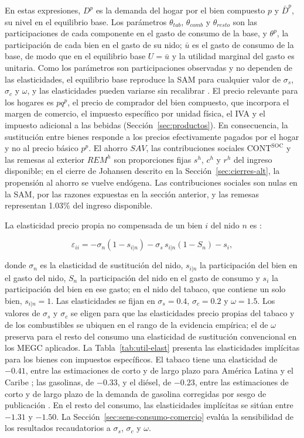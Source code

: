 \documentclass[11pt]{article}
\begin{document}
En estas expresiones, $D^{p}$ es la demanda del hogar por el bien compuesto $p$ y $\bar{D}^{p}$, su nivel en el equilibrio base. Los parámetros $\theta_{tab}$, $\theta_{comb}$ y $\theta_{resto}$ son las participaciones de cada componente en el gasto de consumo de la base, y $\theta^{p}$, la participación de cada bien en el gasto de su nido; $\bar{u}$ es el gasto de consumo de la base, de modo que en el equilibrio base $U=\bar{u}$ y la utilidad marginal del gasto es unitaria. Como los parámetros son participaciones observadas y no dependen de las elasticidades, el equilibrio base reproduce la SAM para cualquier valor de $\sigma_{s}$, $\sigma_{c}$ y $\omega$, y las elasticidades pueden variarse sin recalibrar \cite{rutherford_1995}. El precio relevante para los hogares es $pq^{p}$, el precio de comprador del bien compuesto, que incorpora el margen de comercio, el impuesto específico por unidad física, el IVA y el impuesto adicional a las bebidas (Sección~\ref{sec:productos}). En consecuencia, la sustitución entre bienes responde a los precios efectivamente pagados por el hogar y no al precio básico $p^{p}$. El ahorro $SAV$, las contribuciones sociales $\mathrm{CONT}^{\mathrm{SOC}}$ y las remesas al exterior $REM^{h}$ son proporciones fijas $s^{h}$, $c^{h}$ y $r^{h}$ del ingreso disponible; en el cierre de Johansen descrito en la Sección~\ref{sec:cierres-alt}, la propensión al ahorro se vuelve endógena. Las contribuciones sociales son nulas en la SAM, por las razones expuestas en la sección anterior, y las remesas representan 1.03\% del ingreso disponible.

La elasticidad precio propia no compensada de un bien $i$ del nido $n$ es \cite{keller_1976}:

\[
\varepsilon_{ii}=-\sigma_{n}\left(1-s_{i|n}\right)-\sigma_{s}\,s_{i|n}\left(1-S_{n}\right)-s_{i},
\]

donde $\sigma_{n}$ es la elasticidad de sustitución del nido, $s_{i|n}$ la participación del bien en el gasto del nido, $S_{n}$ la participación del nido en el gasto de consumo y $s_{i}$ la participación del bien en ese gasto; en el nido del tabaco, que contiene un solo bien, $s_{i|n}=1$. Las elasticidades se fijan en $\sigma_{s}=0.4$, $\sigma_{c}=0.2$ y $\omega=1.5$. Los valores de $\sigma_{s}$ y $\sigma_{c}$ se eligen para que las elasticidades precio propias del tabaco y de los combustibles se ubiquen en el rango de la evidencia empírica; el de $\omega$ preserva para el resto del consumo una elasticidad de sustitución convencional en los MEGC aplicados. La Tabla~\ref{tab:util-elast} presenta las elasticidades implícitas para los bienes con impuestos específicos. El tabaco tiene una elasticidad de $-0.41$, entre las estimaciones de corto y de largo plazo para América Latina y el Caribe \cite{guindon_etal_2016}; las gasolinas, de $-0.33$, y el diésel, de $-0.23$, entre las estimaciones de corto y de largo plazo de la demanda de gasolina corregidas por sesgo de publicación \cite{havranek_etal_2012}. En el resto del consumo, las elasticidades implícitas se sitúan entre $-1.31$ y $-1.50$. La Sección~\ref{sec:sens-consumo-comercio} evalúa la sensibilidad de los resultados recaudatorios a $\sigma_{s}$, $\sigma_{c}$ y $\omega$.
\end{document}
